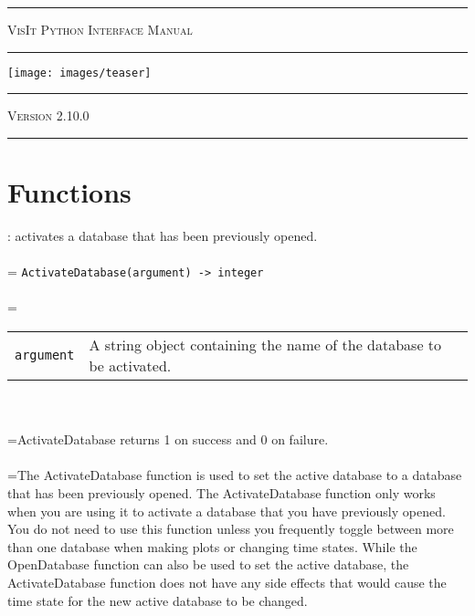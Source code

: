 \documentclass[10pt,a4paper]{report}
\begin{document}
\begin{titlepage}
\begin{center}
\hrule
\textsc{\huge VisIt Python Interface Manual}\\[0.5cm]
\hrule
\texttt{[image: images/teaser]}\\[0.5cm]
\hrule
\textsc{\LARGE Version 2.10.0}\\[0.5cm]
\hrule

\date{}
\end{center}
\end{titlepage}

\tableofcontents
\newpage
{}





\chapter{Functions}


{}
: activates a database that has been previously opened.\\[-3mm]

 \\ 
\hangindent=\parindent 
\verb!ActivateDatabase(argument) -> integer!\\ [-3mm]

 \\ 
\hangindent=\parindent 
\begin{tabular}{lp{9cm}}
\verb!argument! & A string object containing the name of the database to be activated. \\
\end{tabular} \\[-2mm]


 \\ 
\hangindent=\parindent ActivateDatabase returns 1 on success and 0 on failure. \\[-3mm] 

 \\ 
\hangindent=\parindent The ActivateDatabase function is used to set the active database to a database that has been previously opened. The ActivateDatabase function only works when you are using it to activate a database that you have previously opened. You do not need to use this function unless you frequently toggle between more than one database when making plots or changing time states. While the OpenDatabase function can also be used to set the active database, the ActivateDatabase function does not have any side effects that would cause the time state for the new active database to be changed. \\[-3mm] 
\end{document}
